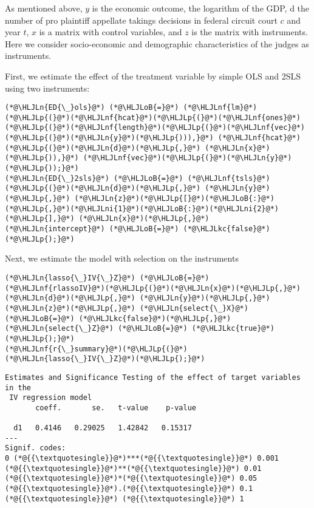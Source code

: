 \documentclass[12pt,a4paper]{article}
\newcommand{\HLJLkc}[1]{\textcolor[RGB]{59,151,46}{\textit{#1}}}
\newcommand{\HLJLn}[1]{#1}
\newcommand{\HLJLnf}[1]{\textcolor[RGB]{66,102,213}{#1}}
\newcommand{\HLJLni}[1]{\textcolor[RGB]{59,151,46}{#1}}
\newcommand{\HLJLoB}[1]{\textcolor[RGB]{102,102,102}{\textbf{#1}}}
\newcommand{\HLJLp}[1]{#1}
\begin{document}
As mentioned above, $y$ is the economic outcome, the logarithm of the GDP, d the number of pro plaintiff appellate takings decisions in federal circuit court $c$ and year $t$, $x$ is a matrix with control variables, and $z$ is the matrix with instruments. Here we consider socio-economic and demographic characteristics of the judges as instruments.

First, we estimate the effect of the treatment variable by simple OLS and 2SLS using two instruments:


\begin{lstlisting}
(*@\HLJLn{ED{\_}ols}@*) (*@\HLJLoB{=}@*) (*@\HLJLnf{lm}@*)(*@\HLJLp{(}@*)(*@\HLJLnf{hcat}@*)(*@\HLJLp{(}@*)(*@\HLJLnf{ones}@*)(*@\HLJLp{(}@*)(*@\HLJLnf{length}@*)(*@\HLJLp{(}@*)(*@\HLJLnf{vec}@*)(*@\HLJLp{(}@*)(*@\HLJLn{y}@*)(*@\HLJLp{))),}@*) (*@\HLJLnf{hcat}@*)(*@\HLJLp{(}@*)(*@\HLJLn{d}@*)(*@\HLJLp{,}@*) (*@\HLJLn{x}@*)(*@\HLJLp{)),}@*) (*@\HLJLnf{vec}@*)(*@\HLJLp{(}@*)(*@\HLJLn{y}@*)(*@\HLJLp{));}@*)
(*@\HLJLn{ED{\_}2sls}@*) (*@\HLJLoB{=}@*) (*@\HLJLnf{tsls}@*)(*@\HLJLp{(}@*)(*@\HLJLn{d}@*)(*@\HLJLp{,}@*) (*@\HLJLn{y}@*)(*@\HLJLp{,}@*) (*@\HLJLn{z}@*)(*@\HLJLp{[}@*)(*@\HLJLoB{:}@*)(*@\HLJLp{,}@*)(*@\HLJLni{1}@*)(*@\HLJLoB{:}@*)(*@\HLJLni{2}@*)(*@\HLJLp{],}@*) (*@\HLJLn{x}@*)(*@\HLJLp{,}@*) (*@\HLJLn{intercept}@*) (*@\HLJLoB{=}@*) (*@\HLJLkc{false}@*)(*@\HLJLp{);}@*)
\end{lstlisting}


Next, we estimate the model with selection on the instruments


\begin{lstlisting}
(*@\HLJLn{lasso{\_}IV{\_}Z}@*) (*@\HLJLoB{=}@*) (*@\HLJLnf{rlassoIV}@*)(*@\HLJLp{(}@*)(*@\HLJLn{x}@*)(*@\HLJLp{,}@*) (*@\HLJLn{d}@*)(*@\HLJLp{,}@*) (*@\HLJLn{y}@*)(*@\HLJLp{,}@*) (*@\HLJLn{z}@*)(*@\HLJLp{,}@*) (*@\HLJLn{select{\_}X}@*) (*@\HLJLoB{=}@*) (*@\HLJLkc{false}@*)(*@\HLJLp{,}@*) (*@\HLJLn{select{\_}Z}@*) (*@\HLJLoB{=}@*) (*@\HLJLkc{true}@*)(*@\HLJLp{);}@*)
(*@\HLJLnf{r{\_}summary}@*)(*@\HLJLp{(}@*)(*@\HLJLn{lasso{\_}IV{\_}Z}@*)(*@\HLJLp{);}@*)
\end{lstlisting}

\begin{lstlisting}
Estimates and Significance Testing of the effect of target variables in the
 IV regression model
       coeff.       se.   t-value    p-value

  d1   0.4146   0.29025   1.42842   0.15317
---
Signif. codes:
0 (*@{{\textquotesingle}}@*)***(*@{{\textquotesingle}}@*) 0.001 (*@{{\textquotesingle}}@*)**(*@{{\textquotesingle}}@*) 0.01 (*@{{\textquotesingle}}@*)*(*@{{\textquotesingle}}@*) 0.05 (*@{{\textquotesingle}}@*).(*@{{\textquotesingle}}@*) 0.1 (*@{{\textquotesingle}}@*) (*@{{\textquotesingle}}@*) 1
\end{lstlisting}
\end{document}
